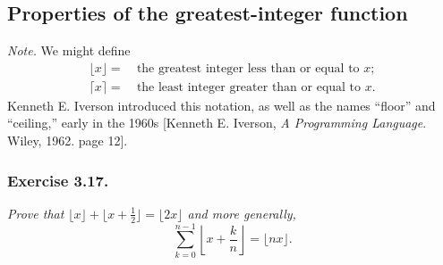 \documentclass{article}
\begin{document}



\subsection*{Properties of the greatest-integer function \\}



\emph{Note.}
We might define
\begin{align*}
  \lfloor x \rfloor = &\: \text{the greatest integer less than or equal to $x$}; \\
  \lceil x \rceil = &\: \text{the least integer greater than or equal to $x$}.
\end{align*}
Kenneth E. Iverson introduced this notation, as well as the names ``floor'' and ``ceiling,''
early in the 1960s [Kenneth E. Iverson, \emph{A Programming Language}. Wiley, 1962. page 12]. \\






\subsubsection*{Exercise 3.17.}
\emph{Prove that $\lfloor x \rfloor + \lfloor x+\frac{1}{2} \rfloor = \lfloor 2x \rfloor$
and more generally,}
\[
  \sum_{k=0}^{n-1} \left\lfloor x + \frac{k}{n} \right\rfloor
  = \lfloor nx \rfloor.
\]
\end{document}
